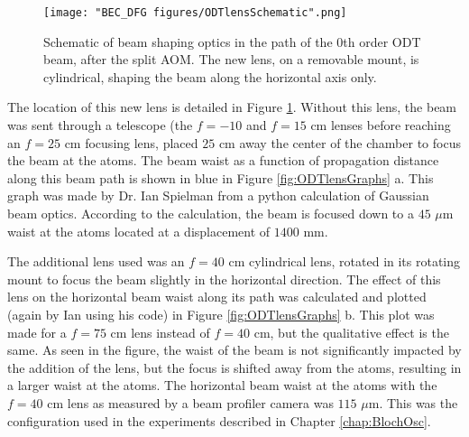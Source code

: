 %

\begin{figure}
	\texttt{[image: "BEC\_DFG figures/ODTlensSchematic".png]}
\caption[Schematic of beam shaping optics in the path of the 0th order ODT beam]{Schematic of beam shaping optics in the path of the 0th order ODT beam, after the split AOM. The new lens, on a removable mount, is cylindrical, shaping the beam along the horizontal axis only. }
\label{fig:ODTlensSchematic}
\end{figure}

The location of this new lens is detailed in Figure \ref{fig:ODTlensSchematic}. Without this lens, the beam was sent through a telescope (the $f=-10$ and $f=15$ cm lenses before reaching an $f=25$ cm focusing lens, placed $25$ cm away the center of the chamber to focus the beam at the atoms. The beam waist as a function of propagation distance along this beam path is shown in blue in Figure \ref{fig:ODTlensGraphs} a. This graph was made by Dr. Ian Spielman from a python calculation of Gaussian beam optics. According to the calculation, the beam is focused down to a $45$ $\mu$m waist at the atoms located at a displacement of $1400$ mm. 

The additional lens used was an $f=40$ cm cylindrical lens, rotated in its rotating mount to focus the beam slightly in the horizontal direction. The effect of this lens on the horizontal beam waist along its path was calculated and plotted (again by Ian using his code) in Figure \ref{fig:ODTlensGraphs} b. This plot was made for a $f=75$ cm lens instead of $f=40$ cm, but the qualitative effect is the same. As seen in the figure, the waist of the beam is not significantly impacted by the addition of the lens, but the focus is shifted away from the atoms, resulting in a larger waist at the atoms. The horizontal beam waist at the atoms with the $f=40$ cm lens as measured by a beam profiler camera was $115$ $\mu$m. This was the configuration used in the experiments described in Chapter \ref{chap:BlochOsc}.

